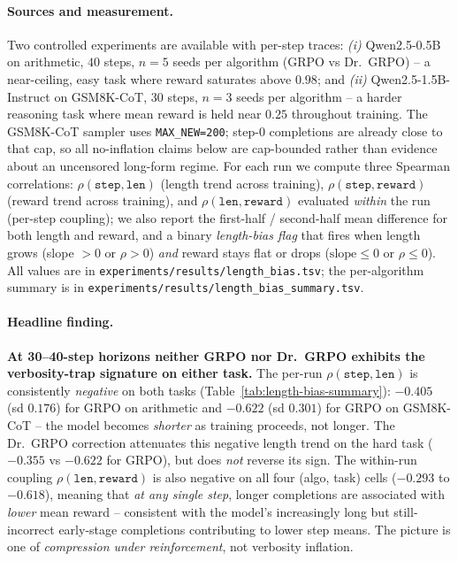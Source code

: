 \documentclass{article}
\begin{document}
\paragraph{Sources and measurement.}
Two controlled experiments are available with per-step traces:
\emph{(i)} Qwen2.5-0.5B on arithmetic, $40$ steps, $n{=}5$ seeds per
algorithm (GRPO vs Dr.~GRPO) -- a near-ceiling, easy task where
reward saturates above $0.98$; and
\emph{(ii)} Qwen2.5-1.5B-Instruct on GSM8K-CoT, $30$ steps, $n{=}3$
seeds per algorithm -- a harder reasoning task where mean reward
is held near $0.25$ throughout training. The GSM8K-CoT sampler uses
\texttt{MAX\_NEW=200}; step-0 completions are already close to that cap, so
all no-inflation claims below are cap-bounded rather than evidence about an
uncensored long-form regime.
For each run we compute three Spearman correlations:
$\rho(\texttt{step}, \texttt{len})$ (length trend across training),
$\rho(\texttt{step}, \texttt{reward})$ (reward trend across
training), and $\rho(\texttt{len}, \texttt{reward})$ evaluated
\emph{within} the run (per-step coupling); we also report the
first-half / second-half mean difference for both length and
reward, and a binary \emph{length-bias flag} that fires when
length grows (slope $>0$ or $\rho>0$) \emph{and} reward stays flat
or drops ($\text{slope}\le 0$ or $\rho\le 0$). All values are in
\texttt{experiments/results/length\_bias.tsv}; the per-algorithm
summary is in
\texttt{experiments/results/length\_bias\_summary.tsv}.

\paragraph{Headline finding.}
\textbf{At 30--40-step horizons neither GRPO nor Dr.~GRPO exhibits
the verbosity-trap signature on either task.} The per-run
$\rho(\texttt{step}, \texttt{len})$ is consistently \emph{negative}
on both tasks (Table~\ref{tab:length-bias-summary}): $-0.405$ (sd
$0.176$) for GRPO on arithmetic and $-0.622$ (sd $0.301$) for GRPO
on GSM8K-CoT -- the model becomes \emph{shorter} as training
proceeds, not longer. The Dr.~GRPO correction attenuates this
negative length trend on the hard task ($-0.355$ vs $-0.622$ for
GRPO), but does \emph{not} reverse its sign. The within-run
coupling $\rho(\texttt{len}, \texttt{reward})$ is also negative on
all four (algo, task) cells ($-0.293$ to $-0.618$), meaning that
\emph{at any single step}, longer completions are associated with
\emph{lower} mean reward -- consistent with the model's
increasingly long but still-incorrect early-stage completions
contributing to lower step means. The picture is one of
\emph{compression under reinforcement}, not verbosity inflation.
\end{document}
